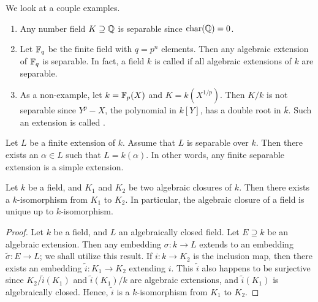 \begin{example}
    We look at a couple examples.
    \begin{enumerate}
        \item Any number field $K \supseteq \mathbb{Q}$ is separable since $\operatorname{char}(\mathbb{Q}) = 0$.
        \item Let $\mathbb{F}_{q}$ be the finite field with $q = p^{n}$ elements. Then any algebraic extension of $\mathbb{F}_{q}$ is separable. In fact, a field $k$ is called  if all algebraic extensions of $k$ are separable.
        \item As a non-example, let $k = \mathbb{F}_{p}(X)$ and $K = k(X^{1/p})$. Then $K/k$ is not separable since $Y^{p} - X$, the polynomial in $k[Y]$, has a double root in $\overline{k}$. Such an extension is called .
    \end{enumerate}
\end{example}

\begin{theorem}
    Let $L$ be a finite extension of $k$. Assume that $L$ is separable over $k$. Then there exists an $\alpha \in L$ such that $L = k(\alpha)$. In other words, any finite separable extension is a simple extension.
\end{theorem}

\begin{theorem}
    Let $k$ be a field, and $K_{1}$ and $K_{2}$ be two algebraic closures of $k$. Then there exists a $k$-isomorphism from $K_{1}$ to $K_{2}$. In particular, the algebraic closure of a field is unique up to $k$-isomorphism.
\end{theorem}

\begin{proof}
    Let $k$ be a field, and $L$ an algebraically closed field. Let $E \supseteq k$ be an algebraic extension. Then any embedding $\sigma:k \to L$ extends to an embedding $\tilde{\sigma}:E \to L$; we shall utilize this result. If $i:k \to K_{2}$ is the inclusion map, then there exists an embedding $\tilde{i}:K_{1} \to K_{2}$ extending $i$. This $\tilde{i}$ also happens to be surjective since $K_{2}/\tilde{i}(K_{1})$ and $\tilde{i}(K_{1})/k$ are algebraic extensions, and $\tilde{i}(K_{1})$ is algebraically closed. Hence, $\tilde{i}$ is a $k$-isomorphism from $K_{1}$ to $K_{2}$.
\end{proof}

